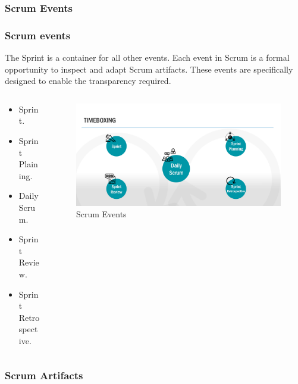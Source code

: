 \documentclass[
	11pt, %
]{beamer}
\begin{document}
\subsubsection{Scrum Events}
\begin{frame}
	\frametitle{Scrum events}
	The Sprint is a container for all other
	events. Each event in Scrum is a formal
	opportunity to inspect and adapt Scrum
	artifacts. These events are specifically
	designed to enable the transparency required.
	\begin{columns}[c] %
		\begin{column}{0.4\textwidth} %
			\begin{itemize} %
				\item Sprint.
				\item Sprint Plaining.
				\item Daily Scrum.
				\item Sprint Review.
				\item Sprint Retrospective.
			\end{itemize}
		\end{column}
		\begin{column}{0.7\textwidth} %
			\begin{figure}
				\includegraphics[width=1\linewidth]{events.png}
				\caption{Scrum Events}
			\end{figure}
		\end{column}
	\end{columns}
\end{frame}

\subsubsection{Scrum Artifacts}
\end{document}
